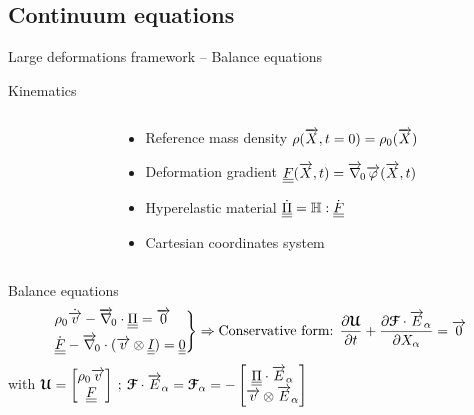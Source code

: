 \subsection{Continuum equations}

\begin{frame}{Large deformations framework -- Balance equations}
  \begin{footnotesize}
    \begin{block}{Kinematics}
      \begin{columns}
        \begin{column}{0.45\textwidth}
          
        \end{column}
        \begin{column}{0.5\textwidth}
          \begin{itemize}
          \item Reference mass density $\rho({\overrightarrow{X}},t=0)=\rho_0({\overrightarrow{X}})$
          \item Deformation gradient ${\underline{\underline{F}}}({\overrightarrow{X}},t)={\overrightarrow{\nabla}}_{\!0}{\overrightarrow{\varphi}}({\overrightarrow{X}},t)$
          \item Hyperelastic material $\dot{{\underline{\underline{\Pi}}}}=\mathbb{H} : \dot{{\underline{\underline{F}}}}$
          \item Cartesian coordinates system
          \end{itemize}
        \end{column}
      \end{columns}
    \end{block}
    \begin{block}{Balance equations \cite{Plohr}}
      \begin{equation*}
        \left.\begin{aligned}
            & \rho_0 \dot{{\overrightarrow{v}}} - {\overrightarrow{\nabla}}_{\!0} \cdot {\underline{\underline{\Pi}}} = {\overrightarrow{0}} \\
            & \dot{{\underline{\underline{F}}}} - {\overrightarrow{\nabla}}_{\!0} \cdot ({\overrightarrow{v}} \otimes {\underline{\underline{I}}})= {\underline{\underline{0}}}
          \end{aligned}\right\rbrace \Rightarrow \text{Conservative form: } \frac{\partial {\boldsymbol{\mathcal{U}}}}{\partial t} + \frac{\partial {\boldsymbol{\mathcal{F}}}\cdot{\overrightarrow{E}}_\alpha}{\partial X_\alpha} = {\overrightarrow{0}}
      \end{equation*}
      with ${\boldsymbol{\mathcal{U}}} = \left[\begin{matrix}\rho_0{\overrightarrow{v}} \\ {\underline{\underline{F}}}\end{matrix}\right] \: ; \: {\boldsymbol{\mathcal{F}}}\cdot{\overrightarrow{E}}_\alpha={\boldsymbol{\mathcal{F}}}_\alpha=-\left[\begin{matrix}{\underline{\underline{\Pi}}}\cdot{\overrightarrow{E}}_\alpha\\ {\overrightarrow{v}} \otimes{\overrightarrow{E}}_\alpha\end{matrix}\right]$
    \end{block}
  \end{footnotesize}
\end{frame}

